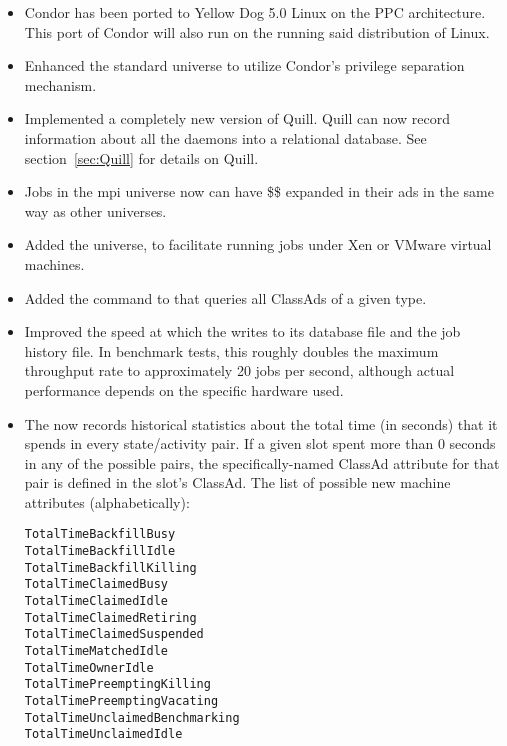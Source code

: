 \begin{itemize}

\item Condor has been ported to Yellow Dog 5.0 Linux on the
PPC architecture. This port of Condor will also run on the
 running said distribution of Linux.

\item Enhanced the standard universe to utilize Condor's privilege separation
mechanism.

\item Implemented a completely new version of Quill.  Quill can now
record information about all the daemons into a relational database.
See section~\ref{sec:Quill} for details on Quill.

\item Jobs in the mpi universe now can have \$\$ expanded in their
ads in the same way as other universes.

\item Added the  universe, to facilitate
running jobs under Xen or VMware virtual machines.

\item Added the  command to  that queries all
ClassAds of a given type.

\item Improved the speed at which the  writes to its database
file  and the job history file.  In benchmark tests,
this roughly doubles the maximum throughput rate to approximately 
20 jobs per second, although actual
performance depends on the specific hardware used.

\item The  now records historical statistics about the
  total time (in seconds) that it spends in every state/activity pair.
  If a given slot spent more than 0 seconds in any of the possible
  pairs, the specifically-named ClassAd attribute for that
  pair is defined in the slot's ClassAd.
  The list of possible new machine attributes (alphabetically):
\begin{verbatim}
TotalTimeBackfillBusy
TotalTimeBackfillIdle
TotalTimeBackfillKilling
TotalTimeClaimedBusy
TotalTimeClaimedIdle
TotalTimeClaimedRetiring
TotalTimeClaimedSuspended
TotalTimeMatchedIdle
TotalTimeOwnerIdle
TotalTimePreemptingKilling
TotalTimePreemptingVacating
TotalTimeUnclaimedBenchmarking
TotalTimeUnclaimedIdle
\end{verbatim}


\end{itemize}
